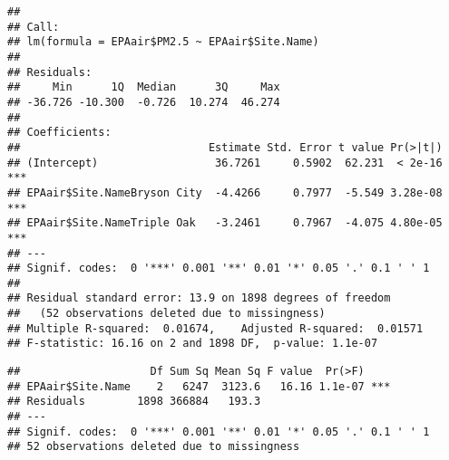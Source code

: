 \documentclass[]{article}
\newenvironment{Shaded}{\begin{snugshade}}{\end{snugshade}}
\newcommand{\KeywordTok}[1]{\textcolor[rgb]{0.13,0.29,0.53}{\textbf{#1}}}
\newcommand{\DecValTok}[1]{\textcolor[rgb]{0.00,0.00,0.81}{#1}}
\newcommand{\FloatTok}[1]{\textcolor[rgb]{0.00,0.00,0.81}{#1}}
\newcommand{\StringTok}[1]{\textcolor[rgb]{0.31,0.60,0.02}{#1}}
\newcommand{\CommentTok}[1]{\textcolor[rgb]{0.56,0.35,0.01}{\textit{#1}}}
\newcommand{\OperatorTok}[1]{\textcolor[rgb]{0.81,0.36,0.00}{\textbf{#1}}}
\newcommand{\NormalTok}[1]{#1}
\begin{document}
\begin{Shaded}
\end{Shaded}

\begin{verbatim}
## 
## Call:
## lm(formula = EPAair$PM2.5 ~ EPAair$Site.Name)
## 
## Residuals:
##     Min      1Q  Median      3Q     Max 
## -36.726 -10.300  -0.726  10.274  46.274 
## 
## Coefficients:
##                             Estimate Std. Error t value Pr(>|t|)    
## (Intercept)                  36.7261     0.5902  62.231  < 2e-16 ***
## EPAair$Site.NameBryson City  -4.4266     0.7977  -5.549 3.28e-08 ***
## EPAair$Site.NameTriple Oak   -3.2461     0.7967  -4.075 4.80e-05 ***
## ---
## Signif. codes:  0 '***' 0.001 '**' 0.01 '*' 0.05 '.' 0.1 ' ' 1
## 
## Residual standard error: 13.9 on 1898 degrees of freedom
##   (52 observations deleted due to missingness)
## Multiple R-squared:  0.01674,    Adjusted R-squared:  0.01571 
## F-statistic: 16.16 on 2 and 1898 DF,  p-value: 1.1e-07
\end{verbatim}

\begin{Shaded}
\end{Shaded}

\begin{verbatim}
##                    Df Sum Sq Mean Sq F value  Pr(>F)    
## EPAair$Site.Name    2   6247  3123.6   16.16 1.1e-07 ***
## Residuals        1898 366884   193.3                    
## ---
## Signif. codes:  0 '***' 0.001 '**' 0.01 '*' 0.05 '.' 0.1 ' ' 1
## 52 observations deleted due to missingness
\end{verbatim}
\end{document}
